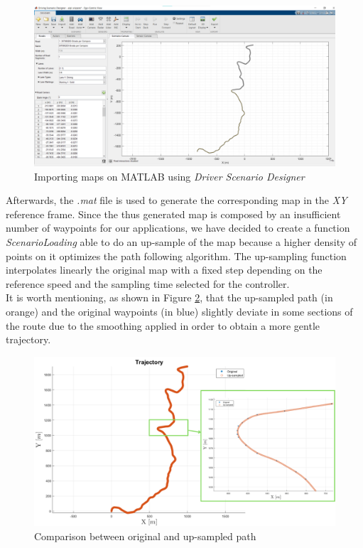 \begin{figure}[H]
    \centering
    \includegraphics[width=1\textwidth]{Figures/DrivingScenarioTool.png}
    \caption{Importing maps on MATLAB using \textit{Driver Scenario Designer}}
      \label{fig:DrivingScenarioTool}
\end{figure}

Afterwards, the \textit{.mat} file is used to generate the corresponding map in the \textit{XY} reference frame.
Since the thus generated map is composed by an insufficient number of waypoints for our applications, we have decided to create a function \textit{ScenarioLoading} able to do an up-sample of the map because a higher density of points on it optimizes the path following algorithm. The up-sampling function interpolates linearly the original map with a fixed step depending on the reference speed and the sampling time selected for the controller. \\
It is worth mentioning, as shown in Figure \ref{fig:UpSample}, that the up-sampled path (in orange) and the original waypoints (in blue) slightly deviate in some sections of the route due to the smoothing applied in order to obtain a more gentle trajectory.

\begin{figure}[H]
    \centering
    \includegraphics[width=1\textwidth]{Figures/UpSample.png}
    \caption{Comparison between original and up-sampled path}
      \label{fig:UpSample}
\end{figure}


